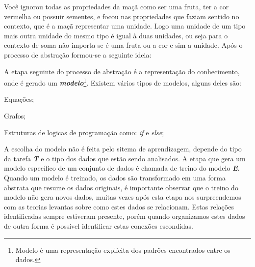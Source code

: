 Você ignorou todas as propriedades da maçã como ser uma fruta, ter a cor vermelha  ou possuir sementes, e focou nas propriedades que faziam sentido no contexto, que é a maçã representar uma unidade. Logo uma unidade de um tipo mais outra unidade do mesmo tipo é igual à duas unidades, ou seja para o contexto de soma não importa se é uma fruta ou a cor e sim a unidade. Após o processo de abstração formou-se a seguinte ideia:


\begin{figure}[h!]
	\centering
\end{figure}

A etapa seguinte do processo de abstração é a representação do conhecimento, onde é gerado um 
\textbf{\textit{modelo}}\footnote{Modelo é uma representação explícita dos padrões encontrados entre os dados.}. 
Existem vários tipos de modelos, alguns deles são:
\begin{alineascomponto}
    \item Equações;
    \item Grafos;
    \item Estruturas de logicas de programação como: \textit{if} e \textit{else}; 
\end{alineascomponto} 

A escolha do modelo não é feita pelo sitema de aprendizagem, depende do tipo da tarefa \textbf{\textit{T}} e o tipo dos dados
que estão sendo analisados. A etapa que gera um modelo específico de um conjunto de dados é chamada de treino do modelo \textbf{\textit{E}}. 
Quando um modelo é treinado, os dados são transformado em uma forma abstrata que resume os dados originais, é importante observar que o  
treino do modelo não gera novos dados, muitas vezes após esta etapa nos surpreendemos com as teorias levantas sobre como 
estes dados se relacionam. Estas relações identificadas sempre estiveram presente, porém quando organizamos estes dados de outra forma
é possível identificar estas conexões escondidas.

